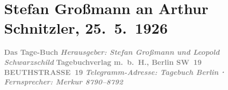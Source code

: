 

         
         \renewcommand{\erwaehntePersonen}{Personen: Leopold Schwarzschild}
         \renewcommand{\erwaehnteInstitutionen}{Institutionen: Das Tage-Buch}
         \renewcommand{\erwaehnteOrte}{Orte: Berlin, Beuthstrasse, Deutschland, Sternwartestraße, Wien, XVIII., Währing}
         \renewcommand{\erwaehnteWerke}{Werke: Bemerkungen, Bemerkungen. (Aus dem noch unveröffentlichten „Buch der Sprüche und Bedenken“.), Buch der Sprüche und Bedenken, Das Tage-Buch, Neue Freie Presse}
               \section[Stefan Großmann an Arthur Schnitzler, 25. 5. 1926]{ Stefan Großmann an Arthur Schnitzler, 25. 5. 1926}\nopagebreak{}\rehead{ }\begin{ledgroupsized}[t]{13cm}\normalsize\beginnumbering \toendnotes[C]{\smallbreak\pagebreak[2]} 
\toendnotes[C]{\smallbreak}\pstart
           \noindent{}\centering{}{\pb}\textcolor{gray}{\textbf{Das Tage-Buch}}\pend
           \pstart
           \noindent{}\centering{}\textcolor{gray}{\textbf{\emph{Herausgeber: Stefan Großmann und Leopold Schwarzschild}}}\pend
           \pstart
           \noindent{}\centering{}\textcolor{gray}{\textbf{Tagebuchverlag m. b. H., Berlin
                        SW 19}}\pend
           \pstart
           \noindent{}\centering{}\textcolor{gray}{\textbf{BEUTHSTRASSE 19}}\pend
           \pstart
           \noindent{}\centering{}\textcolor{gray}{\textbf{\emph{Telegramm-Adresse: Tagebuch Berlin ⋅ Fernsprecher: Merkur 8790–8792}}}\pend
           \pstart
           \noindent{}\centering{}\textcolor{gray}{\textbf{\emph{}}}\pend
           \pstart

\end{ledgroupsized}
